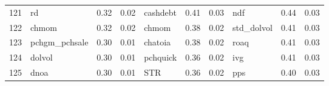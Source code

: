 \documentclass[12pt]{article}
\begin{document}
\begin{landscape}
\begin{footnotesize}
\begin{longtable}{l|lcc|lcc|lcc}
			121                   & rd                          & 0.32                                                                                 & 0.02                            & cashdebt                    & 0.41                                                                                 & 0.03                            & ndf                         & 0.44                                                                                 & 0.03                           \\
			122                   & chmom                       & 0.32                                                                                 & 0.02                            & chmom                       & 0.38                                                                                 & 0.02                            & std\_dolvol                 & 0.41                                                                                 & 0.03                           \\
			123                   & pchgm\_pchsale              & 0.30                                                                                 & 0.01                            & chatoia                     & 0.38                                                                                 & 0.02                            & roaq                        & 0.41                                                                                 & 0.03                           \\
			124                   & dolvol                      & 0.30                                                                                 & 0.01                            & pchquick                    & 0.36                                                                                 & 0.02                            & ivg                         & 0.41                                                                                 & 0.03                           \\
			125                   & dnoa                        & 0.30                                                                                 & 0.01                            & STR                         & 0.36                                                                                 & 0.02                            & pps                         & 0.40                                                                                 & 0.03                           \\

\end{longtable}
\end{footnotesize}
\end{landscape}
\end{document}
